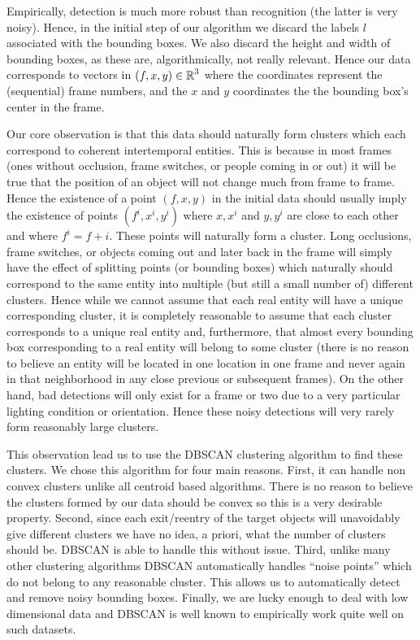 \documentclass{article}
\begin{document}
Empirically, detection is much more robust than recognition (the latter is very noisy). Hence, in the initial step of our algorithm we discard the labels $l$ associated with the 
bounding boxes. We also discard the height and width of bounding boxes, as these are, algorithmically, not really relevant. Hence our data corresponds to vectors in $(f, x, y) \in \operatorname{\mathbb{R}}^3$ where the coordinates 
represent the (sequential) frame numbers, and the $x$ and $y$ coordinates the the bounding box's center in the frame.

Our core observation is that this data should naturally form clusters which each correspond to coherent intertemporal entities. This is because in most frames (ones without occlusion, frame switches, or people
coming in or out) it will be true that the position of an object will not change much from frame to frame. Hence the existence of a point $(f, x, y)$ in the initial data should usually imply the existence 
of points $(f^i, x^i, y^i)$ where $x, x^i$ and $y, y^i$ are close to each other and where $f^i = f + i$. These points will naturally form a cluster. Long occlusions, frame switches, or objects coming out and
later back in the frame will simply have the effect of splitting points (or bounding boxes) which naturally should correspond to the same entity into multiple (but still a small number of) different clusters.
Hence while we cannot assume that each real entity will have a unique corresponding cluster, it is completely reasonable to assume that each cluster corresponds to a unique real entity and, furthermore, that
almost every bounding box corresponding to a real entity will belong to some cluster (there is no reason to believe an entity will be located in one location in one frame and never again in 
that neighborhood in any close previous or subsequent frames). On the other hand, bad detections will only exist for a frame or two due to a very particular lighting condition or orientation. Hence these 
noisy detections will very rarely form reasonably large clusters.

This observation lead us to use the DBSCAN \cite{dbscan} clustering algorithm to find these clusters. We chose this algorithm for four main reasons. First, it can handle non convex clusters unlike all centroid
based algorithms. There is no reason to believe the clusters formed by our data should be convex so this is a very desirable property. Second, since each exit/reentry of the target objects will unavoidably 
give different clusters we have no idea, a priori, what the number of clusters should be. DBSCAN is able to handle this without issue. Third, unlike many other clustering algorithms 
DBSCAN automatically handles ``noise points'' which do not belong to any reasonable cluster. This allows us to automatically detect and remove noisy bounding boxes. Finally, we are lucky enough to deal 
with low dimensional data and DBSCAN is well known to empirically work quite well on such datasets.
\end{document}

